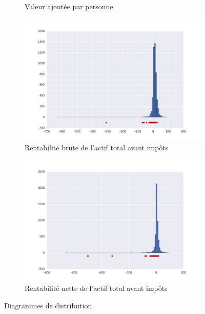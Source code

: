 \documentclass[DIV=calc, paper=a4, fontsize=11pt, twocolumn]{scrartcl}
\begin{document}
\begin{appendices}
\begin{figure}[H]
\begin{subfigure}{.45\textwidth}
    \caption{Valeur ajoutée par personne}
  \end{subfigure}
  \begin{subfigure}{.45\textwidth}
    \centering
    \includegraphics[width=\linewidth]{r11.png}
    \caption{Rentabilité brute de l’actif total avant impôts}
  \end{subfigure}
  \begin{subfigure}{.45\textwidth}
    \centering
    \includegraphics[width=\linewidth]{r12.png}
    \caption{Rentabilité nette de l’actif total avant impôts}
  \end{subfigure}
\caption{Diagrammes de distribution }
\end{figure}


\end{appendices}
\end{document}
